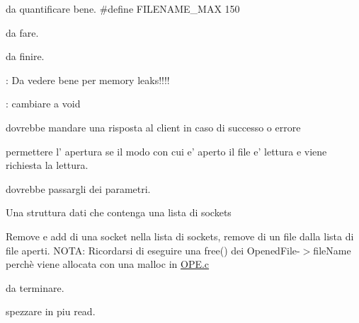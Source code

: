 
\begin{DoxyRefList}
\item[\label{todo__todo000006}%
\hypertarget{todo__todo000006}{}%
Globale \hyperlink{Server_2Config_8c_a1b7ba52f02ee92a5963c7aa917b10c2b}{accept\+Mutex} ]da quantificare bene. \#define F\+I\+L\+E\+N\+A\+M\+E\+\_\+\+M\+A\+X 150  
\item[\label{todo__todo000011}%
\hypertarget{todo__todo000011}{}%
Globale \hyperlink{StruttureDati_8c_a1b93a1e03b27ca80768a152cebb0fed3}{close\+Opened\+File} (unsigned long int ptid)]da fare.  
\item[\label{todo__todo000012}%
\hypertarget{todo__todo000012}{}%
Globale \hyperlink{StruttureDati_8c_a1674324a5bfcb0d5c3a5547c23a73e5a}{free\+Opened\+File} (\hyperlink{structOpenedFile}{Opened\+File} $\ast$id)]da finire.  
\item[\label{todo__todo000008}%
\hypertarget{todo__todo000008}{}%
Globale \hyperlink{OPE_8c_a6eccb6ec6ec9c8375e70ab4088b511a5}{handle\+Open\+Command} (char $\ast$command, int socket)]\+: Da vedere bene per memory leaks!!!!  
\item[\label{todo__todo000004}%
\hypertarget{todo__todo000004}{}%
Globale \hyperlink{Server_2CLOSE_8c_a29faf0797a0c5b3d36a86e72cc023d85}{handle\+Writes} (int number\+Of\+Changes, \hyperlink{structOpenedFile}{Opened\+File} $\ast$id)]\+: cambiare a void  
\item[\label{todo__todo000007}%
\hypertarget{todo__todo000007}{}%
File \hyperlink{OPE_8c}{O\+P\+E.c} ]dovrebbe mandare una risposta al client in caso di successo o errore 

permettere l' apertura se il modo con cui e' aperto il file e' lettura e viene richiesta la lettura.  
\item[\label{todo__todo000009}%
\hypertarget{todo__todo000009}{}%
Globale \hyperlink{server_8c_a5e7b14672f9e2c9fa99b363004afb8e8}{spawn\+Thread} ()]dovrebbe passargli dei parametri.  
\item[\label{todo__todo000010}%
\hypertarget{todo__todo000010}{}%
File \hyperlink{StruttureDati_8c}{Strutture\+Dati.c} ]Una struttura dati che contenga una lista di sockets 

Remove e add di una socket nella lista di sockets, remove di un file dalla lista di file aperti. N\+O\+T\+A\+: Ricordarsi di eseguire una free() dei Opened\+File-\/$>$file\+Name perchè viene allocata con una malloc in \hyperlink{OPE_8c}{O\+P\+E.\+c} 
\item[\label{todo__todo000003}%
\hypertarget{todo__todo000003}{}%
Globale \hyperlink{Test_8c_a9cc4d65ba912461794f9b7523ebedca8}{test\+Stress\+Test} (char $\ast$filename, char $\ast$indirizzo, int debug)]da terminare.  
\item[\label{todo__todo000001}%
\hypertarget{todo__todo000001}{}%
Globale \hyperlink{Client_2CLOSE_8c_affca868a39ef47e0de0a54b7fca94e10}{upload\+Changes} (\hyperlink{structMyDFSId}{My\+D\+F\+S\+Id} $\ast$id)]spezzare in piu read. 
\end{DoxyRefList}